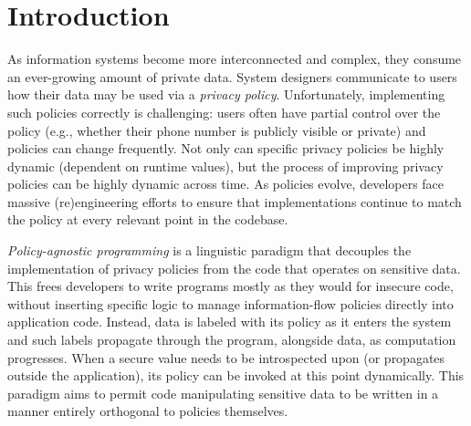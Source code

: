 \documentclass[review=true,acmlarge]{acmart}
\begin{document}



\maketitle

\renewcommand{\shortauthors}{Micinski, Wang, and Gilray}

\section{Introduction}

As information systems become more interconnected and complex, they consume an
ever-growing amount of private data. System designers communicate to users
how their data may be used via a \emph{privacy policy}. Unfortunately,
implementing such policies correctly is challenging: users often have
partial control over the policy (e.g., whether their phone number is
publicly visible or private) and policies can change frequently.
Not only can specific privacy policies be highly dynamic (dependent on runtime values),
but the process of improving privacy policies can be highly dynamic across time.
As policies evolve, developers face massive (re)engineering efforts to
ensure that implementations continue to match the policy at every relevant
point in the codebase.

\emph{Policy-agnostic programming} is a linguistic paradigm that
decouples the implementation of privacy policies from the code that
operates on sensitive data. This frees developers to write programs mostly
as they would for insecure code, without inserting specific logic to manage
information-flow policies directly into application code. Instead, data is
labeled with its policy as it enters the system and such labels propagate through
the program, alongside data, as computation progresses. When a secure value needs
to be introspected upon (or propagates outside the application), its policy
can be invoked at this point dynamically. This paradigm aims to permit
code manipulating sensitive data to be written in a manner entirely orthogonal to
policies themselves.
\end{document}
